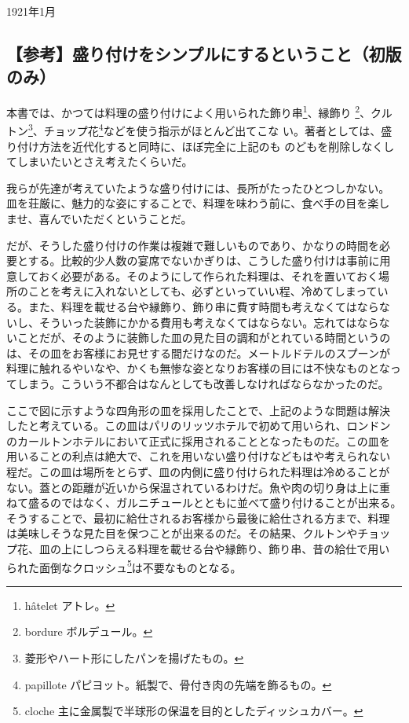 \begin{flushright}
1921年1月
\end{flushright}

\small

\hypertarget{ux53c2ux8003ux76dbux308aux4ed8ux3051ux3092ux30b7ux30f3ux30d7ux30ebux306bux3059ux308bux3068ux3044ux3046ux3053ux3068ux521dux7248ux306eux307f}{%
\subsection{【参考】盛り付けをシンプルにするということ（初版のみ）}\label{ux53c2ux8003ux76dbux308aux4ed8ux3051ux3092ux30b7ux30f3ux30d7ux30ebux306bux3059ux308bux3068ux3044ux3046ux3053ux3068ux521dux7248ux306eux307f}}

本書では、かつては料理の盛り付けによく用いられた飾り串\footnote{hâtelet
  アトレ。}、縁飾り \footnote{bordure ボルデュール。}、クルトン\footnote{菱形やハート形にしたパンを揚げたもの。}、チョップ花\footnote{papillote
  パピヨット。紙製で、骨付き肉の先端を飾るもの。}などを使う指示がほとんど出てこな
い。著者としては、盛り付け方法を近代化すると同時に、ほぼ完全に上記のも
のどもを削除しなくしてしまいたいとさえ考えたくらいだ。

我らが先達が考えていたような盛り付けには、長所がたったひとつしかない。
皿を荘厳に、魅力的な姿にすることで、料理を味わう前に、食べ手の目を楽し
ませ、喜んでいただくということだ。

だが、そうした盛り付けの作業は複雑で難しいものであり、かなりの時間を必
要とする。比較的少人数の宴席でないかぎりは、こうした盛り付けは事前に用
意しておく必要がある。そのようにして作られた料理は、それを置いておく場
所のことを考えに入れないとしても、必ずといっていい程、冷めてしまってい
る。また、料理を載せる台や縁飾り、飾り串に費す時間も考えなくてはならな
いし、そういった装飾にかかる費用も考えなくてはならない。忘れてはならな
いことだが、そのように装飾した皿の見た目の調和がとれている時間というの
は、その皿をお客様にお見せする間だけなのだ。メートルドテルのスプーンが
料理に触れるやいなや、かくも無惨な姿となりお客様の目には不快なものとなっ
てしまう。こういう不都合はなんとしても改善しなければならなかったのだ。

ここで図に示すような四角形の皿を採用したことで、上記のような問題は解決
したと考えている。この皿はパリのリッツホテルで初めて用いられ、ロンドン
のカールトンホテルにおいて正式に採用されることとなったものだ。この皿を
用いることの利点は絶大で、これを用いない盛り付けなどもはや考えられない
程だ。この皿は場所をとらず、皿の内側に盛り付けられた料理は冷めることが
ない。蓋との距離が近いから保温されているわけだ。魚や肉の切り身は上に重
ねて盛るのではなく、ガルニチュールとともに並べて盛り付けることが出来る。
そうすることで、最初に給仕されるお客様から最後に給仕される方まで、料理
は美味しそうな見た目を保つことが出来るのだ。その結果、クルトンやチョッ
プ花、皿の上にしつらえる料理を載せる台や縁飾り、飾り串、昔の給仕で用い
られた面倒なクロッシュ\footnote{cloche
  主に金属製で半球形の保温を目的としたディッシュカバー。}は不要なものとなる。

